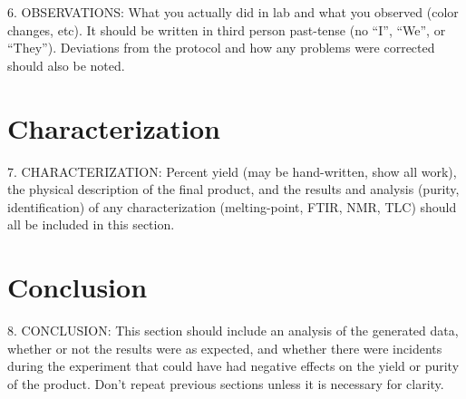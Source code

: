 \documentclass[letterpaper,amsmath,amssymb,prb,preprint,12pt]{revtex4-1}%
\begin{document}
6. OBSERVATIONS: What you actually did in lab and what you observed (color
changes, etc). It should be written in third person past-tense (no “I”, “We”, or
“They”). Deviations from the protocol and how any problems were corrected should
also be noted.

\section{Characterization}

7. CHARACTERIZATION: Percent yield (may be hand-written, show all work), the
physical description of the final product, and the results and analysis (purity,
identification) of any characterization (melting-point, FTIR, NMR, TLC) should all
be included in this section.

\section{Conclusion}

8. CONCLUSION: This section should include an analysis of the generated data,
whether or not the results were as expected, and whether there were incidents during
the experiment that could have had negative effects on the yield or purity of the
product. Don’t repeat previous sections unless it is necessary for clarity.


% 
% 
\end{document}
